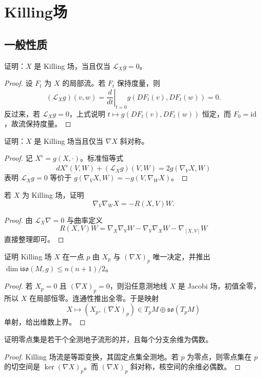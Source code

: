 \documentclass[11pt,a4paper,openany]{ctexbook}
\numberwithin{equation}{chapter}
\begin{document}
\chapter{Killing场}

\section{一般性质}

\begin{problem}
证明：\(X\) 是 Killing 场，当且仅当 \(\mathcal L_X g=0\)。
\end{problem}
\begin{proof}
设 \(F_t\) 为 \(X\) 的局部流。若 \(F_t\) 保持度量，则
\[
(\mathcal L_Xg)(v,w)=\left.\frac{d}{dt}\right|_{t=0}g(DF_t(v),DF_t(w))=0.
\]
反过来，若 \(\mathcal L_Xg=0\)，上式说明 \(t\mapsto g(DF_t(v),DF_t(w))\) 恒定，而 \(F_0=\mathrm{id}\)，故流保持度量。
\end{proof}

\begin{problem}
证明：\(X\) 是 Killing 场当且仅当 \(\nabla X\) 斜对称。
\end{problem}
\begin{proof}
记 \(X^\flat=g(X,\cdot)\)。标准恒等式
\[
dX^\flat(V,W)+(\mathcal L_Xg)(V,W)=2g(\nabla_VX,W)
\]
表明 \(\mathcal L_Xg=0\) 等价于 \(g(\nabla_VX,W)=-g(V,\nabla_WX)\)。
\end{proof}

\begin{problem}
若 \(X\) 为 Killing 场，证明
\[
\nabla_V\nabla_WX=-R(X,V)W.
\]
\end{problem}
\begin{proof}
由 \(\mathcal L_X\nabla=0\) 与曲率定义
\[
R(X,V)W=\nabla_X\nabla_VW-\nabla_V\nabla_XW-\nabla_{[X,V]}W
\]
直接整理即可。
\end{proof}

\begin{problem}
证明 Killing 场 \(X\) 在一点 \(p\) 由 \(X_p\) 与 \((\nabla X)_p\) 唯一决定，并推出
\(\dim\mathfrak{iso}(M,g)\le n(n+1)/2\)。
\end{problem}
\begin{proof}
若 \(X_p=0\) 且 \((\nabla X)_p=0\)，则沿任意测地线 \(X\) 是 Jacobi 场，初值全零，所以 \(X\) 在局部恒零。连通性推出全零。于是映射
\[
X\mapsto (X_p,(\nabla X)_p)\in T_pM\oplus\mathfrak{so}(T_pM)
\]
单射，给出维数上界。
\end{proof}

\begin{problem}
证明零点集是若干个全测地子流形的并，且每个分支余维为偶数。
\end{problem}
\begin{proof}
Killing 场流是等距变换，其固定点集全测地。若 \(p\) 为零点，则零点集在 \(p\) 的切空间是 \(\ker(\nabla X)_p\)。而 \((\nabla X)_p\) 斜对称，核空间的余维必偶数。
\end{proof}
\end{document}
